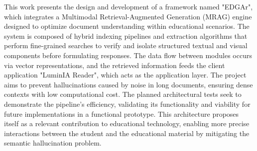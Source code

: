 This work presents the design and development of a framework named "EDGAr", which integrates a Multimodal Retrieval-Augmented Generation (MRAG) engine designed to optimize document understanding within educational scenarios. The system is composed of hybrid indexing pipelines and extraction algorithms that perform fine-grained searches to verify and isolate structured textual and visual components before formulating responses. The data flow between modules occurs via vector representations, and the retrieved information feeds the client application "LuminIA Reader", which acts as the application layer. The project aims to prevent hallucinations caused by noise in long documents, ensuring dense contexts with low computational cost. The planned architectural tests seek to demonstrate the pipeline's efficiency, validating its functionality and viability for future implementations in a functional prototype. This architecture proposes itself as a relevant contribution to educational technology, enabling more precise interactions between the student and the educational material by mitigating the semantic hallucination problem.

